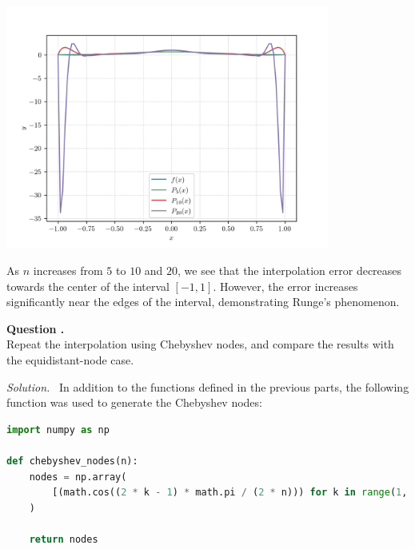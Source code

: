 \documentclass[12pt]{article}
\newcounter{question}
\newcounter{subquest}
\newcommand{\subquestion}{
    \stepcounter{subquest} 
    \vspace{.5em}
    \textbf{\large Question \thequestion.\thesubquest}
    \vspace{.25em}\ \\}
\newcommand{\solution}
    {\par\vspace{0.5em}\noindent\emph{Solution.}\ }
    {\par\vspace{1em}}
\begin{document}
\begin{center}
    \includegraphics[width=0.8\textwidth]{../plots_2/q2_2/all.png}
\end{center}

As $n$ increases from $5$ to $10$ and $20$, we see that the interpolation error decreases towards the center of the interval $[-1,1]$. However, the error increases significantly near the edges of the interval, demonstrating Runge's phenomenon. 

\newpage
\subquestion
Repeat the interpolation using Chebyshev nodes, and compare the results with the equidistant-node case.

\solution
In addition to the functions defined in the previous parts, the following function was used to generate the Chebyshev nodes:
\begin{lstlisting}[language=Python, caption=2.3 Python]
import numpy as np

def chebyshev_nodes(n):
    nodes = np.array(
        [(math.cos((2 * k - 1) * math.pi / (2 * n))) for k in range(1, n + 1)]
    )

    return nodes
\end{lstlisting}
\end{document}
